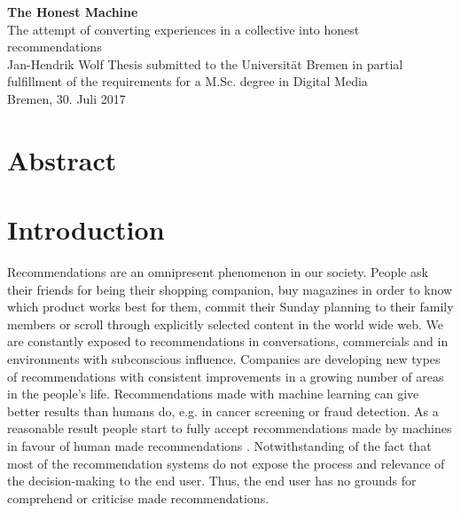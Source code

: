 \documentclass[12pt,numbers=noenddot,parskip,bibliography=totocnumbered,listof=totocnumbered]{scrreprt}
\begin{document}
	
\begin{titlepage}
\null
\vfill

\Huge\textsf{\textbf{The Honest Machine
\vspace{0.5em}}}\\
\LARGE\textsf{ The attempt of converting experiences in a collective into honest recommendations }
\vspace{1.5em}\\
\Large\textsf{Jan-Hendrik Wolf}
\vfill
\vfill
\vfill
\small{Thesis submitted to the Universität Bremen in partial fulfillment of the requirements for a M.Sc. degree in Digital Media\\
Bremen, 30. Juli 2017}
\end{titlepage}


\tableofcontents

\chapter*{Abstract}

\chapter{Introduction}
Recommendations are an omnipresent phenomenon in our society. People ask their friends for being their shopping companion, buy magazines in order to know which product works best for them, commit their Sunday planning to their family members or scroll through explicitly selected content in the world wide web. We are constantly exposed to recommendations in conversations, commercials and in environments with subconscious influence. Companies are developing new types of recommendations with consistent improvements in a growing number of areas in the people's life. Recommendations made with machine learning can give better results than humans do, e.g. in cancer screening or fraud detection. As a reasonable result people start to fully accept recommendations made by machines in favour of human made recommendations \citep{mldoctors}. Notwithstanding of the fact that most of the recommendation systems do not expose the process and relevance of the decision-making to the end user. Thus, the end user has no grounds for comprehend or criticise made recommendations.
\end{document}
